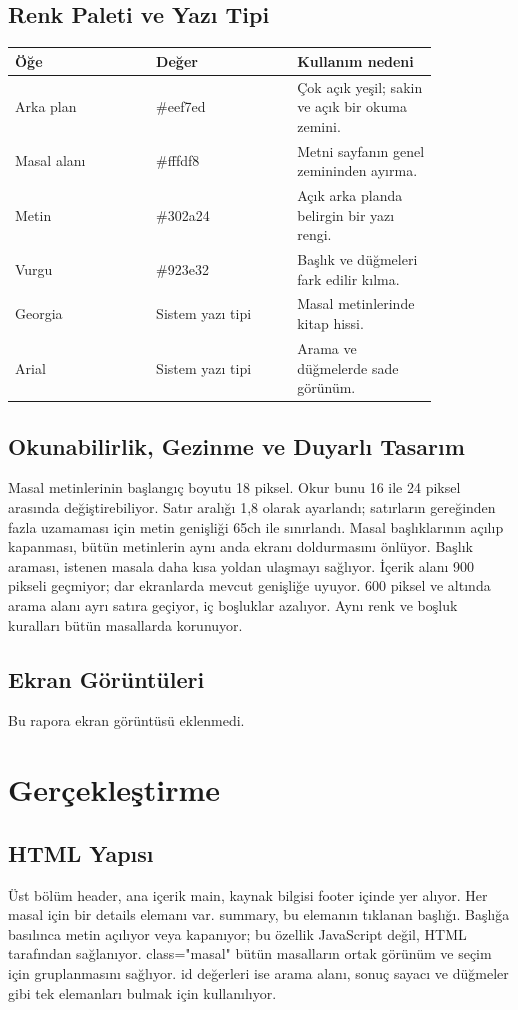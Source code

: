\documentclass[11pt,a4paper]{article}
\begin{document}
\subsection{Renk Paleti ve Yazı Tipi}
\begin{longtable}{|p{0.28\linewidth}|p{0.28\linewidth}|p{0.28\linewidth}|}
\hline \textbf{Öğe} & \textbf{Değer} & \textbf{Kullanım nedeni} \\ \hline\endhead
Arka plan & \#eef7ed & Çok açık yeşil; sakin ve açık bir okuma zemini. \\ \hline
Masal alanı & \#fffdf8 & Metni sayfanın genel zemininden ayırma. \\ \hline
Metin & \#302a24 & Açık arka planda belirgin bir yazı rengi. \\ \hline
Vurgu & \#923e32 & Başlık ve düğmeleri fark edilir kılma. \\ \hline
Georgia & Sistem yazı tipi & Masal metinlerinde kitap hissi. \\ \hline
Arial & Sistem yazı tipi & Arama ve düğmelerde sade görünüm. \\ \hline
\end{longtable}
\subsection{Okunabilirlik, Gezinme ve Duyarlı Tasarım}
Masal metinlerinin başlangıç boyutu 18 piksel. Okur bunu 16 ile 24 piksel arasında değiştirebiliyor. Satır aralığı 1,8 olarak ayarlandı; satırların gereğinden fazla uzamaması için metin genişliği 65ch ile sınırlandı. Masal başlıklarının açılıp kapanması, bütün metinlerin aynı anda ekranı doldurmasını önlüyor. Başlık araması, istenen masala daha kısa yoldan ulaşmayı sağlıyor. İçerik alanı 900 pikseli geçmiyor; dar ekranlarda mevcut genişliğe uyuyor. 600 piksel ve altında arama alanı ayrı satıra geçiyor, iç boşluklar azalıyor. Aynı renk ve boşluk kuralları bütün masallarda korunuyor.

\subsection{Ekran Görüntüleri}
Bu rapora ekran görüntüsü eklenmedi.

\newpage
\section{Gerçekleştirme}
\subsection{HTML Yapısı}
Üst bölüm header, ana içerik main, kaynak bilgisi footer içinde yer alıyor. Her masal için bir details elemanı var. summary, bu elemanın tıklanan başlığı. Başlığa basılınca metin açılıyor veya kapanıyor; bu özellik JavaScript değil, HTML tarafından sağlanıyor. class="masal" bütün masalların ortak görünüm ve seçim için gruplanmasını sağlıyor. id değerleri ise arama alanı, sonuç sayacı ve düğmeler gibi tek elemanları bulmak için kullanılıyor.
\end{document}
